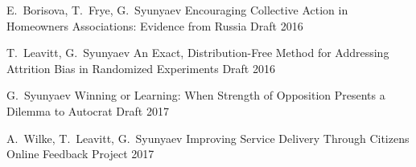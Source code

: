 \begin{cventries}

  \cventry
    {E.~Borisova, T.~Frye, G.~Syunyaev} %
    {Encouraging Collective Action in Homeowners Associations: Evidence from Russia} %
    {Draft} %
    {2016} %
    {
    }

  \cventry
    {T.~Leavitt, G.~Syunyaev} %
    {An Exact, Distribution-Free Method for Addressing Attrition Bias in Randomized Experiments} %
    {Draft} %
    {2016} %
    {
    }

  \cventry
    {G.~Syunyaev} %
    {Winning or Learning: When Strength of Opposition Presents a Dilemma to Autocrat} %
    {Draft} %
    {2017} %
    {
    }

\end{cventries}

\begin{cventries}

  \cventry
    {A.~Wilke, T.~Leavitt, G.~Syunyaev} %
    {Improving Service Delivery Through Citizens Online Feedback} %
    {Project} %
    {2017} %
    {
    }

\end{cventries}